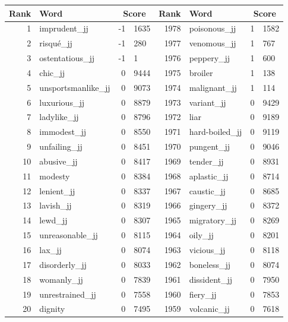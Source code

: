 \begin{table}[tbp]
    \begin{tabular}{| rlr@{.}l | rlr@{.}l |}
    \hline
    \textbf{Rank} & \textbf{Word} & \multicolumn{2}{c|}{\textbf{Score}} & \textbf{Rank} & \textbf{Word} & \multicolumn{2}{c|}{\textbf{Score}} \\
    \hline
    1 & imprudent\_jj & -1 & 1635    &    1978 & poisonous\_jj & 1 & 1582 \\
    2 & risqué\_jj & -1 & 280    &    1977 & venomous\_jj & 1 & 767 \\
    3 & ostentatious\_jj & -1 & 1    &    1976 & peppery\_jj & 1 & 600 \\
    4 & chic\_jj & 0 & 9444    &    1975 & broiler & 1 & 138 \\
    5 & unsportsmanlike\_jj & 0 & 9073    &    1974 & malignant\_jj & 1 & 114 \\
    6 & luxurious\_jj & 0 & 8879    &    1973 & variant\_jj & 0 & 9429 \\
    7 & ladylike\_jj & 0 & 8796    &    1972 & liar & 0 & 9189 \\
    8 & immodest\_jj & 0 & 8550    &    1971 & hard-boiled\_jj & 0 & 9119 \\
    9 & unfailing\_jj & 0 & 8451    &    1970 & pungent\_jj & 0 & 9046 \\
    10 & abusive\_jj & 0 & 8417    &    1969 & tender\_jj & 0 & 8931 \\
    11 & modesty & 0 & 8384    &    1968 & aplastic\_jj & 0 & 8714 \\
    12 & lenient\_jj & 0 & 8337    &    1967 & caustic\_jj & 0 & 8685 \\
    13 & lavish\_jj & 0 & 8319    &    1966 & gingery\_jj & 0 & 8372 \\
    14 & lewd\_jj & 0 & 8307    &    1965 & migratory\_jj & 0 & 8269 \\
    15 & unreasonable\_jj & 0 & 8115    &    1964 & oily\_jj & 0 & 8201 \\
    16 & lax\_jj & 0 & 8074    &    1963 & vicious\_jj & 0 & 8118 \\
    17 & disorderly\_jj & 0 & 8033    &    1962 & boneless\_jj & 0 & 8074 \\
    18 & womanly\_jj & 0 & 7839    &    1961 & dissident\_jj & 0 & 7950 \\
    19 & unrestrained\_jj & 0 & 7558    &    1960 & fiery\_jj & 0 & 7853 \\
    20 & dignity & 0 & 7495    &    1959 & volcanic\_jj & 0 & 7618 \\

\end{tabular}
\end{table}
